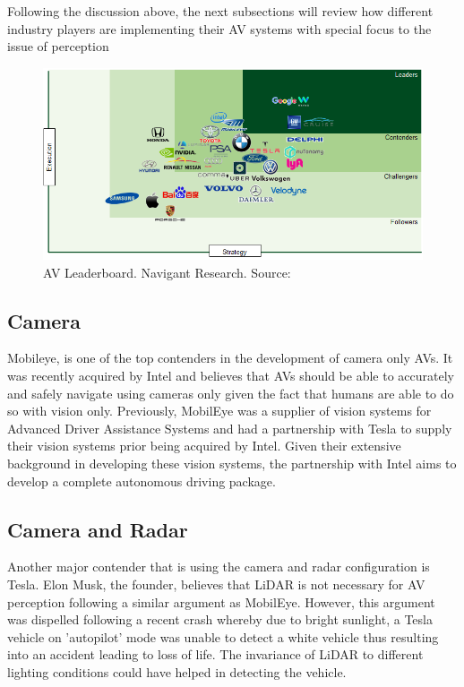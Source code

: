 Following the discussion above, the next subsections will review how different industry players are implementing their AV systems with special focus to the issue of perception
\begin{figure}
	\includegraphics[width=\textwidth]{media/avind.png}
	\caption{AV Leaderboard. Navigant Research. Source:\cite{navigantresearch_2018}}
\end{figure}
\subsection{Camera}
Mobileye\cite{mobileye_2018}, is one of the top contenders in the development of camera only AVs. It was recently acquired by Intel and believes that AVs should be able to accurately and safely navigate using cameras only given the fact that humans are able to do so with vision only. Previously, MobilEye was a supplier of vision systems for Advanced Driver Assistance Systems and had a partnership with Tesla to supply their vision systems prior being acquired by Intel. 
Given their extensive background in developing these vision systems, the partnership with Intel aims to develop a complete autonomous driving package\cite{intelsolutions_2018}.
 

\subsection{Camera and  Radar}
Another major contender that is using the camera and radar configuration is Tesla. Elon Musk, the founder, believes that LiDAR is not necessary for AV perception following a similar argument as MobilEye. However, this argument was dispelled following a recent crash whereby due to bright sunlight, a Tesla vehicle on 'autopilot' mode was unable to detect a white vehicle thus resulting into an accident leading to loss of life. The invariance of LiDAR to different lighting conditions could have helped in detecting the vehicle. 

